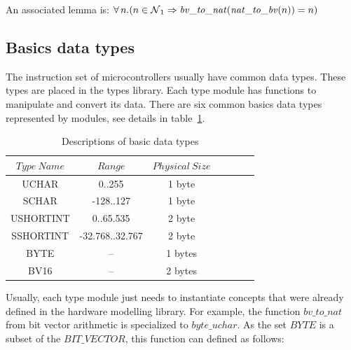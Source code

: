 \documentclass[11pt]{article} %
\begin{document}
An  associated lemma is: $\forall n . (n \in \nat_1 \implies \mathit{bv\_to\_nat}(\mathit{nat\_to\_bv}(n)) = n)$

\subsection{Basics data types}

The instruction set of microcontrollers usually have common data types. These types are placed in the
types library. Each type module has functions to manipulate and convert its data. There are six common
basics data types represented by modules, see details in table~\ref{tab:types}.


\begin{table}
\caption{Descriptions of basic data types}
\label{tab:types}


\begin{center}
\begin{tabular}{|c|c|c|c|c|c|c|}
\hline
 $Type\ Name$ & $Range$ & $Physical\ Size $\\\hline
 UCHAR & 0..255 & 1 byte\\\hline
 SCHAR & -128..127 & 1 byte  \\\hline
 USHORTINT & 0..65.535 & 2 byte \\\hline
 SSHORTINT & -32.768..32.767 & 2 byte \\\hline
 BYTE & -- & 1 bytes  \\\hline
 BV16 & -- & 2 bytes \\ \hline
\end{tabular}
\end{center}


\end{table}




Usually, each type module just needs to instantiate concepts that were already defined in the hardware
modelling library.  For example, the function $\mathit{bv\_to\_nat}$ from bit vector arithmetic is
specialized to $\mathit{byte\_uchar}$. As the set $\mathit{BYTE}$ is a subset of the
$\mathit{BIT\_VECTOR}$, this function can defined as follows:
\end{document}
